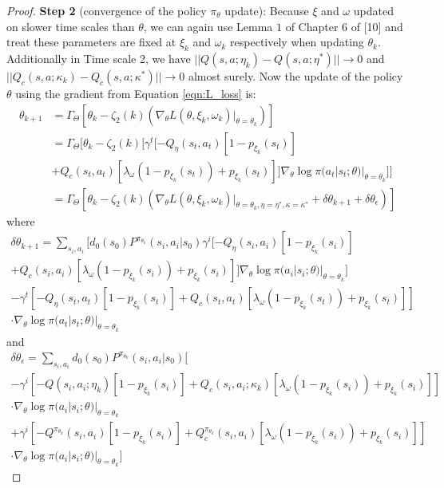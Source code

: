 \documentclass{article}
\theoremstyle{definition}
\begin{document}
\begin{proof}
\textbf{Step 2} (convergence of the policy $\pi_\theta$ update): Because $\xi$ and $\omega$ updated on slower time scales than $\theta$, we can again use Lemma $1$ of Chapter $6$ of [10] and treat these parameters are fixed at $\xi_k$ and $\omega_k$ respectively when updating $\theta_k$. Additionally in Time scale 2, we have $||Q(s,a;\eta_k)-Q(s,a;\eta^*)||\rightarrow 0$ and $||Q_c(s,a;\kappa_k)-Q_c(s,a;\kappa^*)||\rightarrow 0$ almost surely. Now the update of the policy $\theta$ using the gradient from Equation \ref{eqn:L_loss} is:
\begin{align*}
    \theta_{k+1} &=\Gamma_\Theta [ \theta_k - \zeta_2(k)( \nabla_\theta L(\theta, \xi_k, \omega_k)|_{\theta=\theta_k})] \\
    &=\Gamma_\Theta [\theta_k - \zeta_2(k)[\gamma^t [-Q_\eta(s_t,a_t) [1 - p_{\xi_k}(s_t)] \\
    &+ Q_c(s_t,a_t) [\lambda_\omega (1 - p_{\xi_k}(s_t)) + p_{\xi_k}(s_t)]]\nabla_\theta \log \pi(a_t | s_t; \theta) |_{\theta=\theta_k}]]\\
    &=\Gamma_\Theta [ \theta_k - \zeta_2(k) (\nabla_\theta L(\theta, \xi_k, \omega_k)|_{\theta=\theta_k, \eta=\eta^*, \kappa=\kappa^*} + \delta\theta_{k+1} + \delta\theta_\epsilon)]
\end{align*}
where
\begin{align*}
    \delta \theta_{k+1} = \sum_{s_i,a_i} \biggl[d_0(s_0)P^{\pi_{\theta_k}}(s_i,a_i|s_0) \gamma^i [-Q_\eta(s_i,a_i) [1 - p_{\xi_k}(s_i)] &\\
    + Q_c(s_i,a_i) [\lambda_\omega (1 - p_{\xi_k}(s_i)) + p_{\xi_k}(s_i)]]\nabla_\theta \log \pi(a_i | s_i; \theta) |_{\theta=\theta_k}\biggr] &\\ 
    - \gamma^t [-Q_\eta(s_t,a_t) [1 - p_{\xi_k}(s_t)] + Q_c(s_t,a_t) [\lambda_\omega (1 - p_{\xi_k}(s_t)) + p_{\xi_k}(s_t)]] &\\
    \cdot\nabla_\theta \log \pi(a_t | s_t; \theta) |_{\theta=\theta_k} &
\end{align*}
and
\begin{align*}
    \delta \theta_\epsilon = \sum_{s_i,a_i} d_0(s_0)P^{\pi_{\theta_k}}(s_i,a_i|s_0)\biggl[\\
    - \gamma^i [-Q(s_i,a_i;\eta_k) [1 - p_{\xi_k}(s_i)] + Q_c(s_i,a_i; \kappa_k) [\lambda_\omega (1 - p_{\xi_k}(s_i)) + p_{\xi_k}(s_i)]] &\\ 
    \cdot\nabla_\theta \log \pi(a_i | s_i; \theta) |_{\theta=\theta_k} &\\
    + \gamma^i [-Q^{\pi_{\theta_k}}(s_i,a_i) [1 - p_{\xi_k}(s_i)] + Q^{\pi_{\theta_k}}_c(s_i,a_i) [\lambda_\omega (1 - p_{\xi_k}(s_i)) + p_{\xi_k}(s_i)]] &\\
    \cdot\nabla_\theta \log \pi(a_i | s_i; \theta) |_{\theta=\theta_k}
    \biggr] &
\end{align*}


\end{proof}
\end{document}
